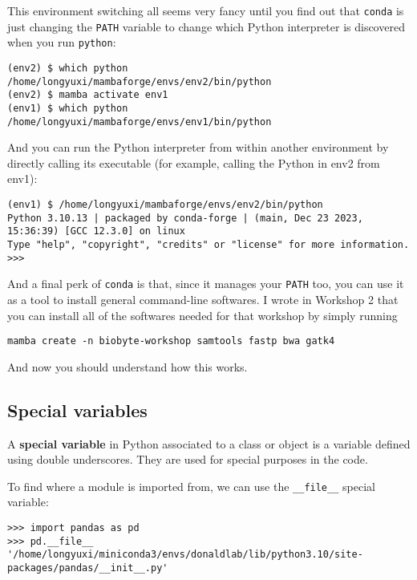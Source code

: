 \documentclass[12pt,letterpaper]{article}
\begin{document}
This environment switching all seems very fancy until you find out that \verb|conda| is just changing the \verb|PATH| variable to change which Python interpreter is discovered when you run \verb|python|:

\begin{verbatim}
(env2) $ which python
/home/longyuxi/mambaforge/envs/env2/bin/python
(env2) $ mamba activate env1
(env1) $ which python
/home/longyuxi/mambaforge/envs/env1/bin/python
\end{verbatim}

And you can run the Python interpreter from within another environment by directly calling its executable (for example, calling the Python in env2 from env1):

\begin{verbatim}
(env1) $ /home/longyuxi/mambaforge/envs/env2/bin/python
Python 3.10.13 | packaged by conda-forge | (main, Dec 23 2023, 15:36:39) [GCC 12.3.0] on linux
Type "help", "copyright", "credits" or "license" for more information.
>>>
\end{verbatim}

And a final perk of \verb|conda| is that, since it manages your \verb|PATH| too, you can use it as a tool to install general command-line softwares. I wrote in Workshop 2 that you can install all of the softwares needed for that workshop by simply running

\begin{verbatim}
mamba create -n biobyte-workshop samtools fastp bwa gatk4
\end{verbatim}

And now you should understand how this works.


\subsection{Special variables}

A \textbf{special variable} in Python associated to a class or object is a variable defined using double underscores. They are used for special purposes in the code.

To find where a module is imported from, we can use the \verb|__file__| special variable:

\begin{verbatim}
>>> import pandas as pd
>>> pd.__file__
'/home/longyuxi/miniconda3/envs/donaldlab/lib/python3.10/site-packages/pandas/__init__.py'
\end{verbatim}
\end{document}

